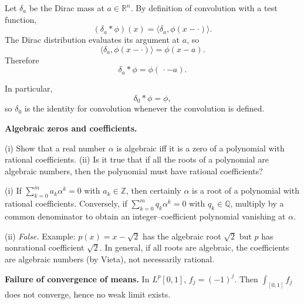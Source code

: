\begin{solution}
Let \(\delta_a\) be the Dirac mass at \(a\in\mathbb R^n\). By definition of convolution with
a test function,
\[
(\delta_a*\phi)(x)
=
\langle\delta_a,\phi(x-\cdot)\rangle.
\]
The Dirac distribution evaluates its argument at \(a\), so
\[
\langle\delta_a,\phi(x-\cdot)\rangle
=
\phi(x-a).
\]
Therefore
\[
\boxed{
\delta_a*\phi=\phi(\,\cdot-a).
}
\]

In particular,
\[
\delta_0*\phi=\phi,
\]
so \(\delta_0\) is the identity for convolution whenever the convolution is defined.
\end{solution}


\begin{problem}[CP-II-0193]
\label{prob:cp-ii-0193}
\textbf{Algebraic zeros and coefficients.}

\hspace*{1.5em}(i) Show that a real number $\alpha$ is algebraic iff it is a zero of a polynomial with rational coefficients.
(ii) Is it true that if all the roots of a polynomial are algebraic numbers, then the polynomial must
have rational coefficients?
\end{problem}

\begin{solution}
(i) If $\sum_{k=0}^m a_k\alpha^k=0$ with $a_k\in\mathbb Z$, then certainly $\alpha$ is a root of a polynomial with rational coefficients. Conversely, if $\sum_{k=0}^m q_k\alpha^k=0$ with $q_k\in\mathbb Q$, multiply by a common denominator to obtain an integer--coefficient polynomial vanishing at $\alpha$.

(ii) \emph{False.} Example: $p(x)=x-\sqrt2$ has the algebraic root $\sqrt2$ but $p$ has nonrational coefficient $\sqrt2$. In general, if all roots are algebraic, the coefficients are algebraic numbers (by Vieta), not necessarily rational.

\bigskip
\end{solution}

\begin{problem}[CP-II-0194]
\label{prob:cp-ii-0194}
\textbf{Failure of convergence of means.}
		In $L^{p}[0,1]$, $f_j=(-1)^j$. Then $\int_{[0,1]} f_j$ does not converge, hence no weak limit exists.
\end{problem}

